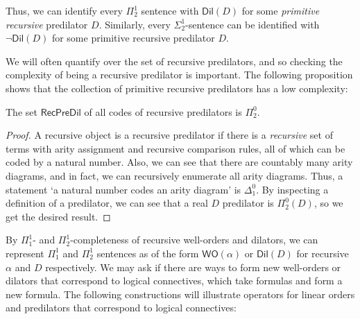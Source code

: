 \documentclass{mhkr}
\newcommand{\WO}{\mathsf{WO}}
\newcommand{\Dil}{\mathsf{Dil}}
\newcommand{\RecPreDil}{\mathsf{RecPreDil}}
\begin{document}
Thus, we can identify every $\Pi^1_2$ sentence with $\Dil(D)$ for some \emph{primitive recursive} predilator $D$. Similarly, every $\Sigma^1_2$-sentence can be identified with $\lnot\Dil(D)$ for some primitive recursive predilator $D$. 

We will often quantify over the set of recursive predilators, and so checking the complexity of being a recursive predilator is important. The following proposition shows that the collection of primitive recursive predilators has a low complexity:
\begin{proposition}
    The set $\RecPreDil$ of all codes of recursive predilators is $\Pi^0_2$.
\end{proposition}
\begin{proof}
    A recursive object is a recursive predilator if there is a \emph{recursive} set of terms with arity assignment and recursive comparison rules, all of which can be coded by a natural number. Also, we can see that there are countably many arity diagrams, and in fact, we can recursively enumerate all arity diagrams. Thus, a statement `a natural number codes an arity diagram' is $\Delta^0_1$. By inspecting a definition of a predilator, we can see that a real $D$ predilator is $\Pi^0_2(D)$, so we get the desired result.
\end{proof}

By $\Pi^1_1$- and $\Pi^1_2$-completeness of recursive well-orders and dilators, we can represent $\Pi^1_1$ and $\Pi^1_2$ sentences as of the form $\WO(\alpha)$ or $\Dil(D)$ for recursive $\alpha$ and $D$ respectively.
We may ask if there are ways to form new well-orders or dilators that correspond to logical connectives, which take formulas and form a new formula. The following constructions will illustrate operators for linear orders and predilators that correspond to logical connectives:
\end{document}
